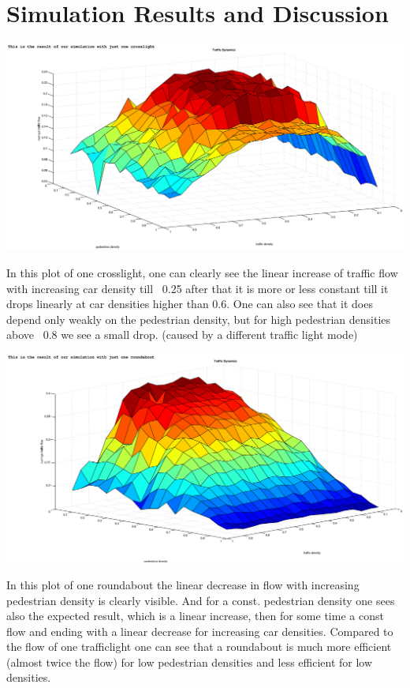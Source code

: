 \section{Simulation Results and Discussion}

{\centering\includegraphics[width=15cm]{images/1-1-trafficlight.eps}}

In this plot of one crosslight, one can clearly see the linear increase of traffic flow with increasing car density till ~0.25 after that it is more or less constant till it drops linearly at car densities higher than 0.6. 
One can also see that it does depend only weakly on the pedestrian density, but for high pedestrian densities above ~0.8 we see a small drop. (caused by a different traffic light mode)

{\centering\includegraphics[width=15cm]{images/1-1-roundabout.eps}}

In this plot of one roundabout the linear decrease in flow with increasing pedestrian density is clearly visible. And for a const. pedestrian density one sees also the expected result, 
which is a linear increase, then for some time a const flow and ending with a linear decrease for increasing car densities. Compared to the flow of one trafficlight one can see that a roundabout is much more efficient (almost twice the flow) for low pedestrian densities
and less efficient for low densities.

